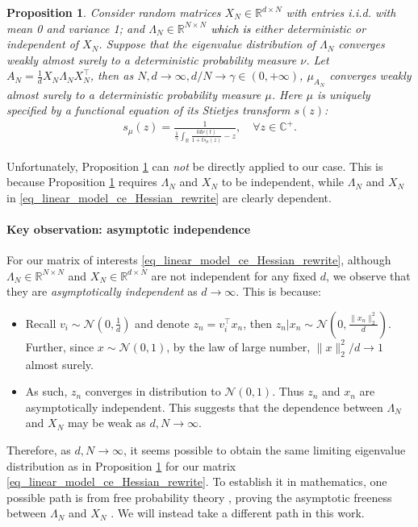 \documentclass{article}
\newcommand{\rw}{\rightarrow}
\newcommand{\1}{^{(1)}}
\newcommand{\2}{^{(2)}}
\newtheorem{prop}{Proposition}
\newcommand{\bea}{\begin{equation}\begin{aligned}}
\newcommand{\eea}{\end{aligned}\end{equation}}
\newcommand{\zhaoruirevise}[1]{\textcolor{black}{ #1}}
\begin{document}
\begin{prop}
    \label{GMP}\citep{Pastur67}
    Consider random matrices $X_N \in \mathbb{R}^{d\times N}$ with entries i.i.d. with mean 0 and variance 1; and $\Lambda_N \in \mathbb{R}^{N\times N}$ \zhaoruirevise{which is}  either deterministic or independent of $X_N$. Suppose that the eigenvalue distribution of $\Lambda_N$ converges weakly almost surely to a deterministic probability measure $\nu$. Let $A_N=\frac{1}{d}X_N \Lambda_N X_N^\top$, then as $N,d\rw\infty, d/N\rw \gamma\in(0,+\infty)$, $\mu_{A_N}$ converges weakly almost surely to a deterministic probability measure $\mu$. Here $\mu$ is uniquely specified by a functional equation of its Stietjes transform $s(z)$:
    \bea\label{GMPeq}
    s_{\mu}(z)=\frac{1}{\frac{1}{\gamma}\int_{\mathbb{R}}\frac
    {t d\nu(t)}{1+ts_{\mu}(z)}-z},\quad \forall z\in\mathbb{C}^+.
    \eea
\end{prop}

Unfortunately, Proposition \ref{GMP} can {\it not} be directly applied to our case. This is because Proposition \ref{GMP} requires  $\Lambda_N$ and $X_N$ to be independent, while  $\Lambda_N$ and $X_N$ 
 in \eqref{eq_linear_model_ce_Hessian_rewrite} are clearly dependent.

\paragraph{Key observation: asymptotic independence} For our matrix of interests \eqref{eq_linear_model_ce_Hessian_rewrite}, although $\Lambda_N \in \mathbb{R}^{N\times N}$ and $X_N \in  \mathbb{R}^{d\times N}$ are not  independent for any fixed $d$, we observe that they are {\it asymptotically independent} as $d\rightarrow \infty$. This is because: 
\begin{itemize}
[topsep=1pt,parsep=1pt,partopsep=1pt, leftmargin=*]
    \item Recall $v_i \sim \mathcal{N}(0,\frac{1}{d})$ and denote  $z_n = v_i^\top x_n$, then $z_n |x_n \sim \mathcal{N}(0,\frac{\|x_n\|^2_2}{d})$. Further, since $x\sim  \mathcal{N}(0,1)$, by the law of large number, $\|x\|_2^2/d\rw1$ almost surely.
    \item As such, $z_n$ converges in distribution to $\mathcal{N}(0,1)$. Thus $z_n$ and $x_n$ are asymptotically independent. This suggests that the dependence between $\Lambda_N$ and $X_N$ may be weak as $d,N\rw\infty$. 
\end{itemize}

Therefore, as $d,N \rightarrow \infty$, it seems possible to obtain the same limiting eigenvalue distribution as in Proposition \ref{GMP} for our matrix \eqref{eq_linear_model_ce_Hessian_rewrite}.
To establish it in mathematics, one possible path is from free probability theory \citep{Mingobook}, proving the asymptotic freeness between $\Lambda_N$ and $X_N$ \citep{CollinsFreeness}. We will instead take a different path in this work.
\end{document}
